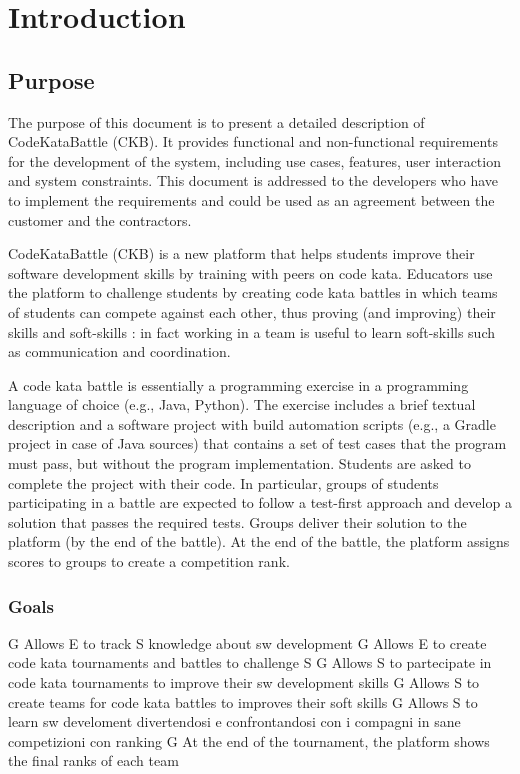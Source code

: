 \chapter{Introduction}

\section{Purpose}
The purpose of this document is to present a detailed description of CodeKataBattle (CKB).
It provides functional and non-functional requirements for the development of the system, including use cases, features, user interaction and system constraints. This document is addressed to the developers who have to implement the requirements and
could be used as an agreement between the customer and the contractors.

CodeKataBattle (CKB) is a new platform that helps students improve their software development skills by training with peers on code kata. Educators use the platform to challenge students by creating code
kata battles in which teams of students can compete against each other, thus proving (and improving) their skills and soft-skills : in fact working in a team is useful to learn soft-skills such as
communication and coordination.

A code kata battle is essentially a programming exercise in a programming language of choice (e.g.,
Java, Python). The exercise includes a brief textual description and a software project with build
automation scripts (e.g., a Gradle project in case of Java sources) that contains a set of test cases that
the program must pass, but without the program implementation. Students are asked to complete the
project with their code. In particular, groups of students participating in a battle are expected to follow
a test-first approach and develop a solution that passes the required tests. Groups deliver their
solution to the platform (by the end of the battle). At the end of the battle, the platform assigns scores
to groups to create a competition rank.

\subsection{Goals}
G Allows E to track S knowledge about sw development
G Allows E to create code kata tournaments and battles to challenge S
G Allows S to partecipate in code kata tournaments to improve their sw development skills
G Allows S to create teams for code kata battles to improves their soft skills
G Allows S to learn sw develoment divertendosi e confrontandosi con i compagni in sane competizioni con ranking
G At the end of the tournament, the platform shows the final ranks of each team

